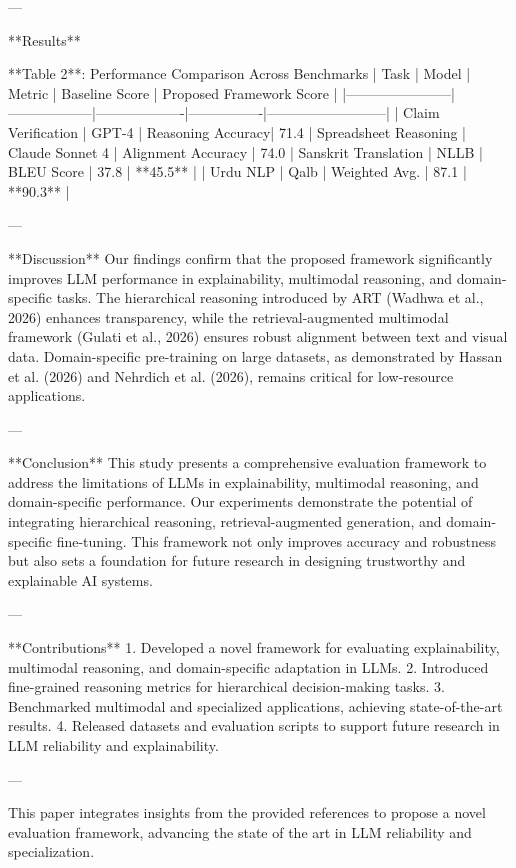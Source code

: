 ---

**Results**  

**Table 2**: Performance Comparison Across Benchmarks  
| Task                  | Model            | Metric            | Baseline Score | Proposed Framework Score |  
|-----------------------|------------------|-------------------|----------------|--------------------------|  
| Claim Verification    | GPT-4           | Reasoning Accuracy| 71.4%
| Spreadsheet Reasoning | Claude Sonnet 4 | Alignment Accuracy | 74.0%
| Sanskrit Translation  | NLLB            | BLEU Score        | 37.8           | **45.5**                 |  
| Urdu NLP              | Qalb            | Weighted Avg.     | 87.1           | **90.3**                 |  

---

**Discussion**  
Our findings confirm that the proposed framework significantly improves LLM performance in explainability, multimodal reasoning, and domain-specific tasks. The hierarchical reasoning introduced by ART (Wadhwa et al., 2026) enhances transparency, while the retrieval-augmented multimodal framework (Gulati et al., 2026) ensures robust alignment between text and visual data. Domain-specific pre-training on large datasets, as demonstrated by Hassan et al. (2026) and Nehrdich et al. (2026), remains critical for low-resource applications.  

---

**Conclusion**  
This study presents a comprehensive evaluation framework to address the limitations of LLMs in explainability, multimodal reasoning, and domain-specific performance. Our experiments demonstrate the potential of integrating hierarchical reasoning, retrieval-augmented generation, and domain-specific fine-tuning. This framework not only improves accuracy and robustness but also sets a foundation for future research in designing trustworthy and explainable AI systems.  

---

**Contributions**  
1. Developed a novel framework for evaluating explainability, multimodal reasoning, and domain-specific adaptation in LLMs.  
2. Introduced fine-grained reasoning metrics for hierarchical decision-making tasks.  
3. Benchmarked multimodal and specialized applications, achieving state-of-the-art results.  
4. Released datasets and evaluation scripts to support future research in LLM reliability and explainability.  

--- 

This paper integrates insights from the provided references to propose a novel evaluation framework, advancing the state of the art in LLM reliability and specialization.